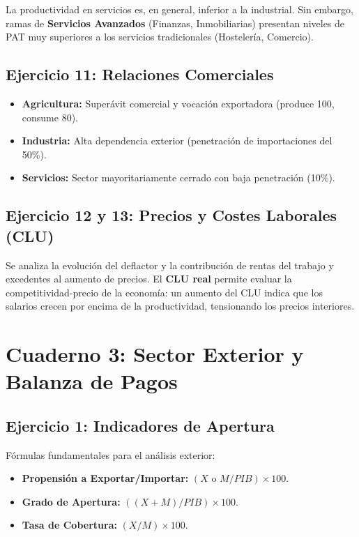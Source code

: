 La productividad en servicios es, en general, inferior a la industrial. Sin embargo, ramas de \textbf{Servicios Avanzados} (Finanzas, Inmobiliarias) presentan niveles de PAT muy superiores a los servicios tradicionales (Hostelería, Comercio).

\subsection{Ejercicio 11: Relaciones Comerciales}

\begin{itemize}
    \item \textbf{Agricultura:} Superávit comercial y vocación exportadora (produce 100, consume 80).
    \item \textbf{Industria:} Alta dependencia exterior (penetración de importaciones del 50\%).
    \item \textbf{Servicios:} Sector mayoritariamente cerrado con baja penetración (10\%).
\end{itemize}

\subsection{Ejercicio 12 y 13: Precios y Costes Laborales (CLU)}

Se analiza la evolución del deflactor y la contribución de rentas del trabajo y excedentes al aumento de precios. El \textbf{CLU real} permite evaluar la competitividad-precio de la economía: un aumento del CLU indica que los salarios crecen por encima de la productividad, tensionando los precios interiores.

\section{Cuaderno 3: Sector Exterior y Balanza de Pagos}

\subsection{Ejercicio 1: Indicadores de Apertura}

Fórmulas fundamentales para el análisis exterior:
\begin{itemize}
    \item \textbf{Propensión a Exportar/Importar:} $(X \text{ o } M / PIB) \times 100$.
    \item \textbf{Grado de Apertura:} $((X + M) / PIB) \times 100$.
    \item \textbf{Tasa de Cobertura:} $(X / M) \times 100$.
\end{itemize}

